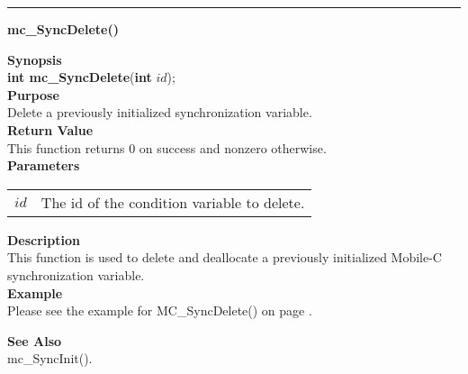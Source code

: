\noindent
\vspace{5pt}
\rule{6.5in}{0.015in}
\noindent
{}
{\LARGE \bf mc\_SyncDelete()}\\

\noindent
{\bf Synopsis}\\
{\bf int mc\_SyncDelete}({\bf int} $id$);\\

\noindent
{\bf Purpose}\\
Delete a previously initialized synchronization variable.\\

\noindent
{\bf Return Value}\\
This function returns 0 on success and nonzero otherwise.\\

\noindent
{\bf Parameters}
\vspace{-0.1in}
\begin{description}
\item
\begin{tabular}{p{10 mm}p{145 mm}}
$id$ & The id of the condition variable to delete.
\end{tabular}
\end{description}

\noindent
{\bf Description}\\
This function is used to delete and deallocate a previously initialized 
Mobile-C synchronization variable.\\
 
\noindent
{\bf Example}\\
Please see the example for MC\_SyncDelete() on page
\pageref{api:MC_SyncDelete()}.\\
\noindent

\noindent
{\bf See Also}\\
mc\_SyncInit().\\

